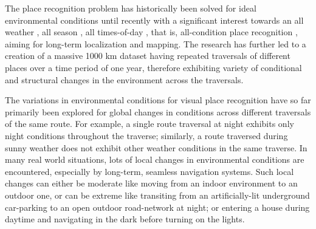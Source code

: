 \documentclass[letterpaper, 10 pt, conference]{ieeeconf}  %
\begin{document}
The place recognition problem has historically been solved for ideal environmental conditions \cite{thompson1993vision,Cummins2009} until recently with a significant interest towards an all weather \cite{linegar2016made}, all season \cite{McManus2015,chen2017deep}, all times-of-day \cite{linegar2015work}, that is,  all-condition place recognition \cite{Milford2012},  aiming for long-term localization and mapping. The research has further led to a creation of a massive 1000 km dataset \cite{maddern20161} having repeated traversals of different places over a time period of one year, therefore exhibiting variety of conditional and structural changes in the environment across the traversals.

The variations in environmental conditions for visual place recognition have so far primarily been explored for global changes in conditions across different traversals of the same route. For example, a single route traversal at night exhibits only night conditions throughout the traverse; similarly, a route traversed during sunny weather does not exhibit other weather conditions in the same traverse. In many real world situations, lots of local changes in environmental conditions are encountered, especially by long-term, seamless navigation systems. Such local changes can either be moderate like moving from an indoor environment to an outdoor one, or can be extreme like transiting from an artificially-lit underground car-parking to an open outdoor road-network at night; or entering a house during daytime and navigating in the dark before turning on the lights.  
\end{document}
